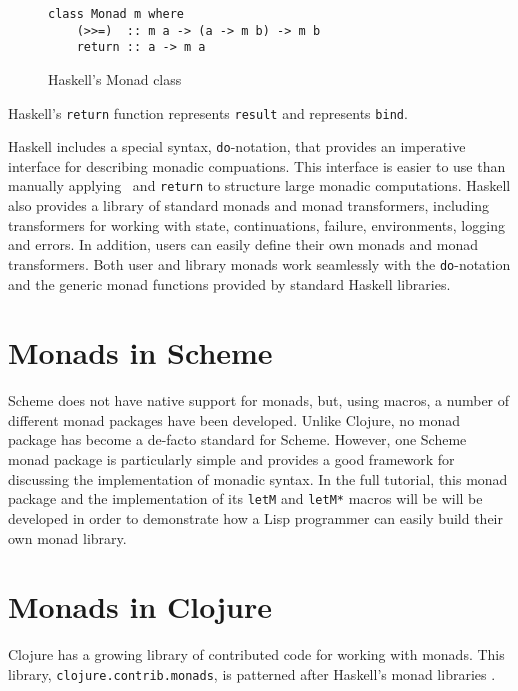 \documentclass[natbib,10pt]{sigplanconf}
\begin{document}
\begin{figure}
\begin{center}
\begin{verbatim}
class Monad m where
    (>>=)  :: m a -> (a -> m b) -> m b
    return :: a -> m a
\end{verbatim}
\end{center}
\caption{Haskell's Monad class}
\label{fig-Haskell-Monad-class}
\end{figure}

Haskell's {\tt return} function represents \texttt{result} and
\hbind \linebreak represents \texttt{bind}.

Haskell includes a special syntax, {\tt do}-notation, that provides
an imperative interface for describing monadic compuations. This 
interface is easier to use than manually applying \hbind \ and {\tt return}
to structure large monadic computations. Haskell also provides a
library of standard monads and monad transformers, including
transformers for working with state, continuations, failure,
environments, logging and errors.  In addition, users can easily
define their own monads and monad transformers. Both user and
library monads work seamlessly with the {\tt do}-notation and
the generic monad functions provided by standard Haskell 
libraries.

\section{Monads in Scheme}

Scheme does not have native support for monads, but, using macros,
a number of different monad packages have been developed. Unlike 
Clojure, no monad package has become a de-facto
standard for Scheme. However, one Scheme monad package \citep{scheme-monads} 
is particularly simple and provides a good framework for discussing 
the implementation of monadic syntax. In the full tutorial, this monad 
package and the implementation of its {\tt letM} and {\tt letM*} macros
will be will be developed in order to demonstrate how a Lisp 
programmer can easily build their own monad library.

\section{Monads in Clojure}

Clojure has a growing library of contributed code for working with
monads. This library, {\tt clojure.contrib.monads}, is patterned after 
Haskell's monad libraries \citep{clojure-monads1, clojure-monads2}.
\end{document}
